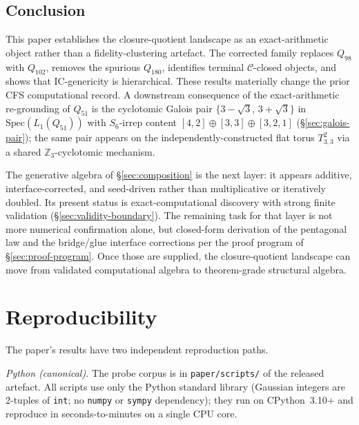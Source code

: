 \documentclass[12pt,a4paper]{article}
\theoremstyle{definition}
\theoremstyle{remark}
\newcommand{\bZ}{\mathbb{Z}}
\newcommand{\Ccls}{\mathcal{C}}             %
\begin{document}
\subsection{Conclusion}\label{sec:disc-conclusion}

This paper establishes the closure-quotient landscape as an
exact-arithmetic object rather than a fidelity-clustering artefact.
The corrected family replaces $Q_{98}$ with $Q_{102}$, removes the
spurious $Q_{180}$, identifies terminal $\Ccls$-closed objects, and
shows that IC-genericity is hierarchical. These results materially
change the prior CFS computational record. A downstream consequence of
the exact-arithmetic re-grounding of $Q_{51}$ is the cyclotomic Galois
pair $\{3-\sqrt 3,\,3+\sqrt 3\}$ in $\mathrm{Spec}(L_1(Q_{51}))$ with
$S_6$-irrep content $[4,2] \oplus [3,3] \oplus [3,2,1]$
(\S\ref{sec:galois-pair}); the same pair appears on the
independently-constructed flat torus $T^2_{3,3}$ via a shared
$\bZ_3$-cyclotomic mechanism.

The generative algebra of \S\ref{sec:composition} is the next layer:
it appears additive, interface-corrected, and seed-driven rather than
multiplicative or iteratively doubled. Its present status is
exact-computational discovery with strong finite validation
(\S\ref{sec:validity-boundary}). The remaining task for that layer is
not more numerical confirmation alone, but closed-form derivation of
the pentagonal law and the bridge/glue interface corrections per the
proof program of \S\ref{sec:proof-program}. Once those are supplied,
the closure-quotient landscape can move from validated computational
algebra to theorem-grade structural algebra.

\section{Reproducibility}\label{sec:reproducibility}

The paper's results have two independent reproduction paths.

\emph{Python (canonical).} The probe corpus is in
\texttt{paper/scripts/} of the released artefact. All scripts use only
the Python standard library (Gaussian integers are 2-tuples of
\texttt{int}; no \texttt{numpy} or \texttt{sympy} dependency); they run
on CPython~3.10+ and reproduce in seconds-to-minutes on a single CPU
core.
\end{document}
